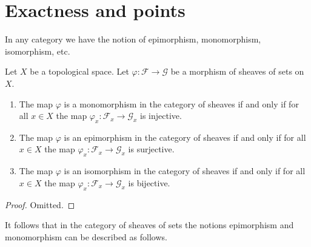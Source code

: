 \section{Exactness and points}
\label{section-exactness-points}

\noindent
In any category we have the notion of epimorphism, monomorphism,
isomorphism, etc.

\begin{lemma}
\label{lemma-points-exactness}
Let $X$ be a topological space. Let $\varphi : \mathcal{F} \to \mathcal{G}$
be a morphism of sheaves of sets on $X$.
\begin{enumerate}
\item The map $\varphi$ is a monomorphism in the category of sheaves
if and only if for all $x \in X$ the map
$\varphi_x : \mathcal{F}_x \to \mathcal{G}_x$
is injective.
\item The map $\varphi$ is an epimorphism in the category of sheaves
if and only if for all $x \in X$ the map
$\varphi_x : \mathcal{F}_x \to \mathcal{G}_x$
is surjective.
\item The map $\varphi$ is an isomorphism in the category of sheaves
if and only if for all $x \in X$ the map
$\varphi_x : \mathcal{F}_x \to \mathcal{G}_x$
is bijective.
\end{enumerate}
\end{lemma}

\begin{proof}
Omitted.
\end{proof}

\noindent
It follows that in the category of sheaves of sets
the notions epimorphism and monomorphism can be described
as follows.

